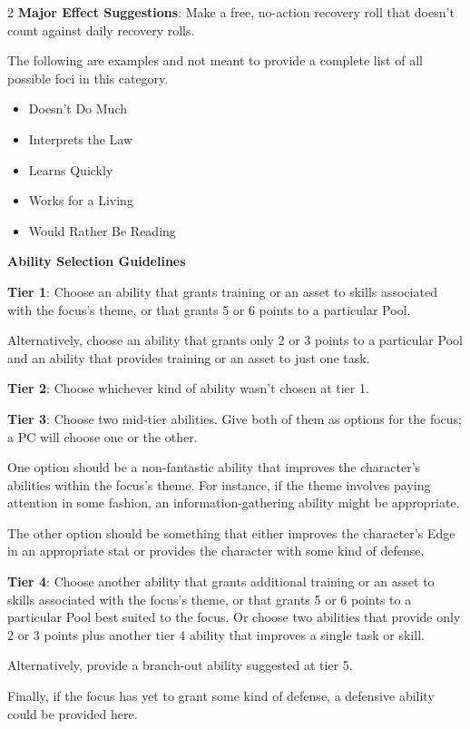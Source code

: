 \begin{multicols}{2}
\textbf{Major Effect Suggestions}: Make a free, no-action recovery roll that doesn’t count against daily recovery rolls.

The following are examples and not meant to provide a complete list of all possible foci in this category.

\begin{itemize}
\item Doesn’t Do Much
\item Interprets the Law
\item Learns Quickly
\item Works for a Living
\item Would Rather Be Reading
\end{itemize}

\textbf{Ability Selection Guidelines}

\textbf{Tier 1}: Choose an ability that grants training or an asset to skills associated with the focus’s theme, or that grants 5 or 6 points to a particular Pool. 

Alternatively, choose an ability that grants only 2 or 3 points to a particular Pool and an ability that provides training or an asset to just one task.

\textbf{Tier 2}: Choose whichever kind of ability wasn’t chosen at tier 1. 

\textbf{Tier 3}: Choose two mid-tier abilities. Give both of them as options for the focus; a PC will choose one or the other.

One option should be a non-fantastic ability that improves the character’s abilities within the focus’s theme. For instance, if the theme involves paying attention in some fashion, an information-gathering ability might be appropriate.

The other option should be something that either improves the character’s Edge in an appropriate stat or provides the character with some kind of defense.

\textbf{Tier 4}: Choose another ability that grants additional training or an asset to skills associated with the focus’s theme, or that grants 5 or 6 points to a particular Pool best suited to the focus. Or choose two abilities that provide only 2 or 3 points plus another tier 4 ability that improves a single task or skill.

Alternatively, provide a branch-out ability suggested at tier 5.

Finally, if the focus has yet to grant some kind of defense, a defensive ability could be provided here.


\end{multicols}
